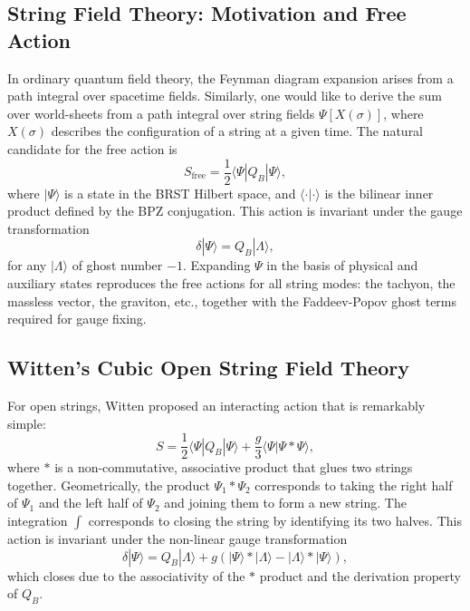 \documentclass[11pt]{article}
\begin{document}
\subsection{String Field Theory: Motivation and Free Action}

In ordinary quantum field theory, the Feynman diagram expansion arises from a path integral over spacetime fields. Similarly, one would like to derive the sum over world-sheets from a path integral over string fields $\Psi[X(\sigma)]$, where $X(\sigma)$ describes the configuration of a string at a given time. The natural candidate for the free action is
\begin{equation}
S_{\text{free}} = \frac{1}{2} \langle \Psi | Q_B | \Psi \rangle,
\end{equation}
where $| \Psi \rangle$ is a state in the BRST Hilbert space, and $\langle \cdot | \cdot \rangle$ is the bilinear inner product defined by the BPZ conjugation. This action is invariant under the gauge transformation
\begin{equation}
\delta |\Psi\rangle = Q_B |\Lambda\rangle,
\end{equation}
for any $|\Lambda\rangle$ of ghost number $-1$. Expanding $\Psi$ in the basis of physical and auxiliary states reproduces the free actions for all string modes: the tachyon, the massless vector, the graviton, etc., together with the Faddeev-Popov ghost terms required for gauge fixing.

\subsection{Witten's Cubic Open String Field Theory}

For open strings, Witten proposed an interacting action that is remarkably simple:
\begin{equation}
S = \frac{1}{2} \langle \Psi | Q_B | \Psi \rangle + \frac{g}{3} \langle \Psi | \Psi * \Psi \rangle,
\end{equation}
where $*$ is a non-commutative, associative product that glues two strings together. Geometrically, the product $\Psi_1 * \Psi_2$ corresponds to taking the right half of $\Psi_1$ and the left half of $\Psi_2$ and joining them to form a new string. The integration $\int$ corresponds to closing the string by identifying its two halves. This action is invariant under the non-linear gauge transformation
\begin{equation}
\delta |\Psi\rangle = Q_B |\Lambda\rangle + g (|\Psi\rangle * |\Lambda\rangle - |\Lambda\rangle * |\Psi\rangle),
\end{equation}
which closes due to the associativity of the $*$ product and the derivation property of $Q_B$.
\end{document}

